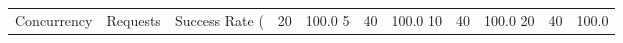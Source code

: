 \begin{tabular}{rrllllll}
\toprule
Concurrency & Requests & Success Rate (%
 & 20 & 100.0%
5 & 40 & 100.0%
10 & 40 & 100.0%
20 & 40 & 100.0%
\bottomrule
\end{tabular}
